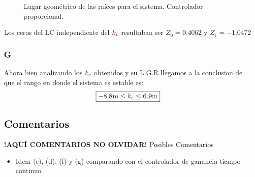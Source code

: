 \begin{figure}[ht]
    \centering
    
    \caption{Lugar geométrico de las raíces para el sistema. Controlador proporcional.}
    \label{fig:lgr-i2}
\end{figure}

Los ceros del LC independiente del \(\mathbin{\color{violet}k_c}\) resultaban ser $Z_{0} = 0.4062 $ y $Z_{1} = -1.0472$ 


\FloatBarrier
\subsubsection{G}%

Ahora bien analizando los \(\mathbin{\color{violet}k_c}\) obtenidos y su L.G.R llegamos a la
conclusion de que el rango en donde el sistema es estable es:
\begin{equation}
  \boxed{ -8.8\unit{m} \leq \mora{k_{c}} \leq 6.9\unit{m} }
\end{equation}

\FloatBarrier
\subsection{Comentarios}


\textbf{!AQUÍ COMENTARIOS NO OLVIDAR!}
Posibles Comentarios
\begin{itemize}
    \item Idem (c), (d), (f) y (g) comparando con el controlador de ganancia tiempo continuo
\end{itemize}
